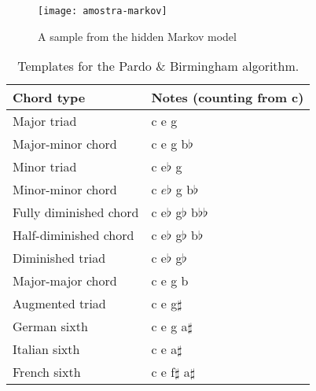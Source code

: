 \documentclass[a0paper]{sciposter}
\begin{document}
\begin{multicols}{2}
\begin{center}
\begin{figure}[t]
  \centering
  \texttt{[image: amostra-markov]}
  \caption{A sample from the hidden Markov model}
  \label{fig:amostra}
\end{figure}

\begin{table}[h]
  \centering
  \begin{small}
    \begin{sc}
      \begin{tabular}[t]{ll} \hline
        Chord type & Notes (counting from c) \\ \hline
        Major triad & c e g \\
        Major-minor chord &  c e g b$\flat$ \\
        Minor triad & c e$\flat$ g \\
        Minor-minor chord & c $e\flat$ g b$\flat$ \\
        Fully diminished chord & c e$\flat$ g$\flat$ b$\flat\flat$ \\
        Half-diminished chord & c e$\flat$ g$\flat$ b$\flat$ \\
        Diminished triad & c e$\flat$ g$\flat$ \\
        Major-major chord & c e g b \\
        Augmented triad & c e g$\sharp$ \\
        German sixth  & c e g a$\sharp$ \\
        Italian sixth & c e a$\sharp$ \\
        French sixth & c e f$\sharp$ a$\sharp$ \\ \hline
      \end{tabular}
    \end{sc}
  \end{small}
  \caption{Templates for the Pardo \& Birmingham algorithm.}
  \label{tab:templates-pardo}
\end{table}
\end{center}

\end{multicols}
\end{document}
